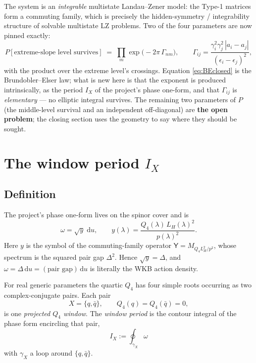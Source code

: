 \documentclass[11pt]{article}
\newcommand{\dd}{\mathrm d}
\newcommand{\Yop}{\mathsf Y}
\begin{document}
The system is an \emph{integrable} multistate Landau--Zener model: the Type-1
matrices form a commuting family, which is precisely the hidden-symmetry /
integrability structure of solvable multistate LZ problems. Two of the four
parameters are now pinned exactly:
\begin{equation}
\label{eq:BEclosed}
 P[\text{extreme-slope level survives}]
 \;=\;\prod_{m}\exp\!\bigl(-2\pi\,\Gamma_{nm}\bigr),
 \qquad
 \Gamma_{ij}=\frac{\gamma_i^2\gamma_j^2\,|a_i-a_j|}{(\epsilon_i-\epsilon_j)^2},
\end{equation}
with the product over the extreme level's crossings. Equation
\eqref{eq:BEclosed} is the Brundobler--Elser law; what is new here is that the
exponent is produced intrinsically, as the period $I_X$ of the project's phase
one-form, and that $\Gamma_{ij}$ is \emph{elementary} --- no elliptic integral
survives. The remaining two parameters of $P$ (the middle-level survival and an
independent off-diagonal) are \textbf{the open problem}; the closing section
uses the geometry to say where they should be sought.

\section{The window period \texorpdfstring{$I_X$}{I\_X}}

\subsection{Definition}

The project's phase one-form lives on the spinor cover and is
\begin{equation}
 \omega=\sqrt{y}\;\dd u,\qquad
 y(\lambda)=\frac{Q_4(\lambda)\,L_H(\lambda)^2}{p(\lambda)^2}.
\end{equation}
Here $y$ is the symbol of the commuting-family operator
$\Yop=M_{Q_4L_H^2/p^2}$, whose spectrum is the squared pair gap $\Delta^2$.
Hence $\sqrt y=\Delta$, and $\omega=\Delta\,\dd u=(\text{pair gap})\,\dd u$ is
literally the WKB action density.

For real generic parameters the quartic $Q_4$ has four simple roots occurring as
two complex-conjugate pairs. Each pair
\begin{equation}
 X=\{q,\bar q\},\qquad Q_4(q)=Q_4(\bar q)=0,
\end{equation}
is one \emph{projected $Q_4$ window}. The \emph{window period} is the contour
integral of the phase form encircling that pair,
\begin{equation}
\label{eq:IXdef}
 \boxed{\;I_X:=\oint_{\gamma_X}\omega\;}
\end{equation}
with $\gamma_X$ a loop around $\{q,\bar q\}$.
\end{document}
